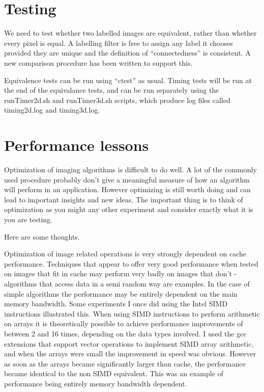 \documentclass{InsightArticle}
\begin{document}
\section{Testing}
We need to test whether two labelled images are equivalent, rather
than whether every pixel is equal. A labelling filter is free to
assign any label it chooses provided they are unique and the
definition of ``connectedness'' is consistent. A new comparison
procedure has been written to support this.

Equivalence tests can be run using ``ctest'' as usual. Timing tests
will be run at the end of the equivalance tests, and can be run
separately using the runTimer2d.sh and runTimer3d.sh scripts, which
produce log files called timing2d.log and timing3d.log.

\section{Performance lessons}
\label{sect:performance_lessons}
Optimization of imaging algorithms is difficult to do well. A lot of
the commonly used procedure probably don't give a meaningful measure
of how an algorithm will perform in an application. However optimizing
is still worth doing and can lead to important insights and new
ideas. The important thing is to think of optimization as you might
any other experiment and consider exactly what it is you are testing.

Here are some thoughts.

Optimization of image related operations is very strongly dependent on
cache performance. Techniques that appear to offer very good
performance when tested on images that fit in cache may perform very
badly on images that don't - algorithms that access data in a semi
random way are examples. In the case of simple algorithms the
performance may be entirely dependent on the main memory
bandwidth. Some experiments I once did using the Intel SIMD
instructions illustrated this. When using SIMD instructions to perform
arithmetic on arrays it is theoretically possible to achieve
performance improvements of between 2 and 16 times, depending on the
data types involved. I used the gcc extensions that support vector
operations to implement SIMD array arithmetic, and when the arrays
were small the improvement in speed was obvious. However as soon as
the arrays became significantly larger than cache, the performance
became identical to the non SIMD equivalent. This was an example of
performance being entirely memory bandwidth dependent.
\end{document}
